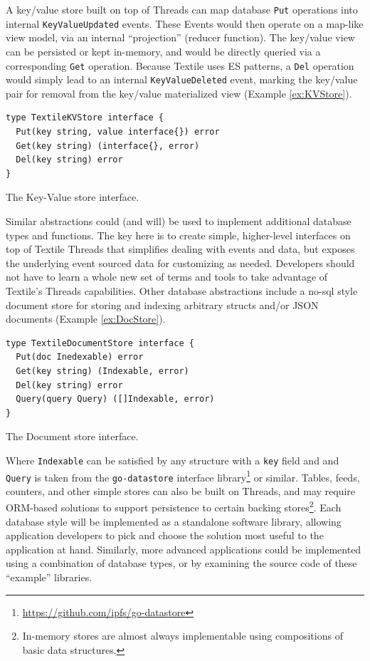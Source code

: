 \documentclass{textile}
\begin{document}
A key/value store built on top of Threads can map database \texttt{Put} operations into internal \texttt{KeyValueUpdated} events. These Events would then operate on a map-like view model, via an internal ``projection'' (reducer function). The key/value view can be persisted or kept in-memory, and would be directly queried via a corresponding \texttt{Get} operation. Because Textile uses ES patterns, a \texttt{Del} operation would simply lead to an internal \texttt{KeyValueDeleted} event, marking the key/value pair for removal from the key/value materialized view (Example \ref{ex:KVStore}).

\begin{example}
\begin{minipage}{.45\textwidth}
\begin{lstlisting}
type TextileKVStore interface {
  Put(key string, value interface{}) error
  Get(key string) (interface{}, error)
  Del(key string) error
}
\end{lstlisting}
\end{minipage}
\caption{The Key-Value store interface.}
 \label{ex:KVStore}
\end{example}

Similar abstractions could (and will) be used to implement additional database types and functions. The key here is to create simple, higher-level interfaces on top of Textile Threads that simplifies dealing with events and data, but exposes the underlying event sourced data for customizing as needed. Developers should not have to learn a whole new set of terms and tools to take advantage of Textile's Threads capabilities. Other database abstractions include a no-sql style document store for storing and indexing arbitrary structs and/or JSON documents (Example \ref{ex:DocStore}).

\begin{example}
\begin{minipage}{.45\textwidth}
\begin{lstlisting}
type TextileDocumentStore interface {
  Put(doc Inedexable) error
  Get(key string) (Indexable, error)
  Del(key string) error
  Query(query Query) ([]Indexable, error)
}
\end{lstlisting}
\end{minipage}
\caption{The Document store interface.}
\label{ex:DocStore}
\end{example} 

Where \texttt{Indexable} can be satisfied by any structure with a \texttt{key} field and and \texttt{Query} is taken from the \texttt{go-datastore} interface library\footnote{\url{https://github.com/ipfs/go-datastore}} or similar.
Tables, feeds, counters, and other simple stores can also be built on Threads, and may require ORM-based solutions to support persistence to certain backing stores\footnote{In-memory stores are almost always implementable using compositions of basic data structures.}.
Each database style will be implemented as a standalone software library, allowing application developers to pick and choose the solution most useful to the application at hand.
Similarly, more advanced applications could be implemented using a combination of database types, or by examining the source code of these ``example'' libraries.
\end{document}
